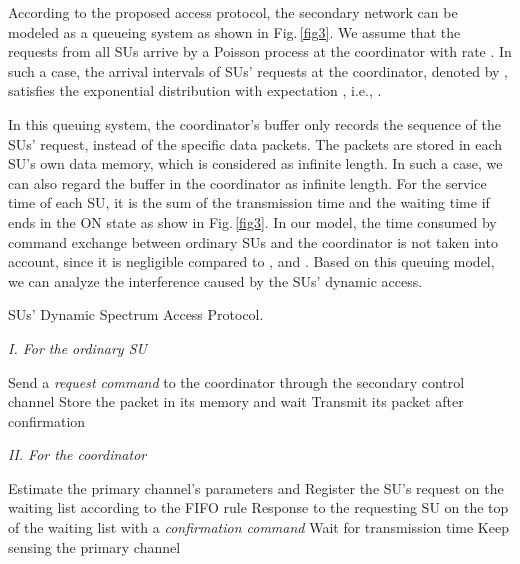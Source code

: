 \documentclass[11pt,draftcls]{IEEEtran}{\onecolumn}
\begin{document}
According to the proposed access protocol, the secondary network can
be modeled as a queueing system as shown in Fig.\,\ref{fig3}.
We assume that the requests from all SUs arrive by a Poisson process at the
coordinator with rate .
In such a case, the arrival intervals of SUs' requests at the
coordinator, denoted by , satisfies the exponential
distribution with expectation , i.e., .

In this queuing system, the coordinator's buffer only records the
sequence of the SUs' request, instead of the specific data packets.
The packets are stored in each SU's own data memory, which is
considered as infinite length. In such a case, we can also regard
the buffer in the coordinator as infinite length. For the service
time of each SU, it is the sum of the transmission time  and
the waiting time if  ends in the ON state as show in
Fig.\,\ref{fig3}. In our model, the time consumed by command
exchange between ordinary SUs and the coordinator is not taken into
account, since it is negligible compared to ,  and
. Based on this queuing model, we can analyze the
interference caused by the SUs' dynamic access.

{\renewcommand\baselinestretch{1.2}\selectfont
\begin{algorithm}[!t] \caption{SUs' Dynamic Spectrum
Access Protocol.} \vspace{2mm}\emph{I. For the ordinary SU}
\begin{algorithmic}[1]\label{algorithm1}
\small{}
    \STATE {\textbullet} Send a \emph{request command} to the coordinator through the secondary control channel
        \STATE {\textbullet} Store the packet in its memory and wait
    \ENDWHILE
    \STATE {\textbullet} Transmit its packet after confirmation
\ENDIF
\end{algorithmic}
\emph{II. For the coordinator}
\begin{algorithmic}[1]
\small\STATE {\textbullet} Estimate the primary channel's parameters
 and  
    \STATE {\textbullet} Register the SU's request on the waiting list according to the FIFO rule \ENDIF {}
    \STATE {\textbullet} Response to the requesting SU on the top of the waiting list with a \emph{confirmation command}
    \STATE {\textbullet} Wait for transmission time 
\ENDWHILE \STATE {\textbullet} Keep sensing the primary channel
\end{algorithmic}
\end{algorithm}
\par}
\end{document}
